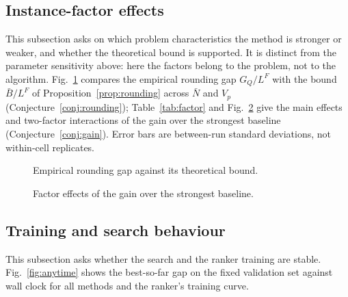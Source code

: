 \subsection{Instance-factor effects}\label{sec:factor}
This subsection asks on which problem characteristics the method is stronger or weaker, and whether the theoretical bound is
supported. It is distinct from the parameter sensitivity above: here the factors belong to the problem, not to the algorithm.
Fig.~\ref{fig:rounding} compares the empirical rounding gap $G_Q/L^F$ with the bound $\bar B/L^F$ of
Proposition~\ref{prop:rounding} across $\bar N$ and $V_p$ (Conjecture~\ref{conj:rounding}); Table~\ref{tab:factor} and
Fig.~\ref{fig:factor} give the main effects and two-factor interactions of the gain over the strongest baseline
(Conjecture~\ref{conj:gain}). Error bars are between-run standard deviations, not within-cell replicates.

\begin{table}
\centering\small
\caption{Instance-factor main effects on the main tier (27 instances with distinct parameters, 9 per level; error is the between-run std over \NumRuns{} runs).}\label{tab:factor}

\end{table}

\begin{figure}
\caption{Empirical rounding gap against its theoretical bound.}\label{fig:rounding}
\end{figure}

\begin{figure}
\caption{Factor effects of the gain over the strongest baseline.}\label{fig:factor}
\end{figure}

\subsection{Training and search behaviour}\label{sec:training}
This subsection asks whether the search and the ranker training are stable. Fig.~\ref{fig:anytime} shows the best-so-far gap
on the fixed validation set against wall clock for all methods and the ranker's training curve.

